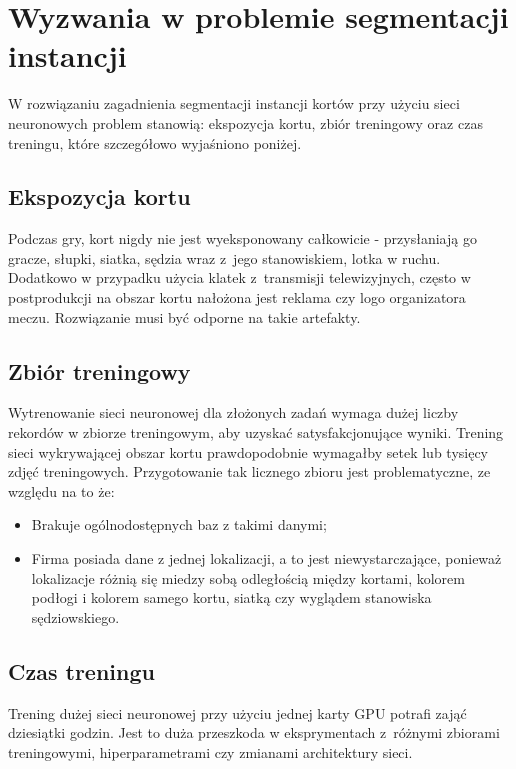 \section{Wyzwania w problemie segmentacji instancji}

W rozwiązaniu zagadnienia segmentacji instancji kortów przy użyciu sieci neuronowych problem stanowią: ekspozycja kortu, zbiór treningowy oraz czas treningu, które szczegółowo wyjaśniono poniżej.

\subsection*{Ekspozycja kortu}

Podczas gry, kort nigdy nie jest wyeksponowany całkowicie - przysłaniają go gracze, słupki, siatka, sędzia wraz z~jego stanowiskiem, lotka w ruchu.
Dodatkowo w przypadku użycia klatek z~transmisji telewizyjnych, często w postprodukcji na obszar kortu nałożona jest reklama czy logo organizatora meczu.
Rozwiązanie musi być odporne na takie artefakty.

\subsection*{Zbiór treningowy}

Wytrenowanie sieci neuronowej dla złożonych zadań wymaga dużej liczby rekordów w zbiorze treningowym, aby uzyskać satysfakcjonujące wyniki.
Trening sieci wykrywającej obszar kortu prawdopodobnie wymagałby setek lub tysięcy zdjęć treningowych.
Przygotowanie tak licznego zbioru jest problematyczne, ze względu na to że:

\begin{itemize}
	\item Brakuje ogólnodostępnych baz z takimi danymi;
	\item Firma posiada dane z jednej lokalizacji, a to jest niewystarczające, ponieważ lokalizacje różnią się miedzy sobą odległością między kortami, kolorem podłogi i kolorem samego kortu, siatką czy wyglądem stanowiska sędziowskiego.
\end{itemize}

\subsection*{Czas treningu}

Trening dużej sieci neuronowej przy użyciu jednej karty GPU potrafi zająć dziesiątki godzin.
Jest to duża przeszkoda w eksprymentach z~różnymi zbiorami treningowymi, hiperparametrami czy zmianami architektury sieci.

